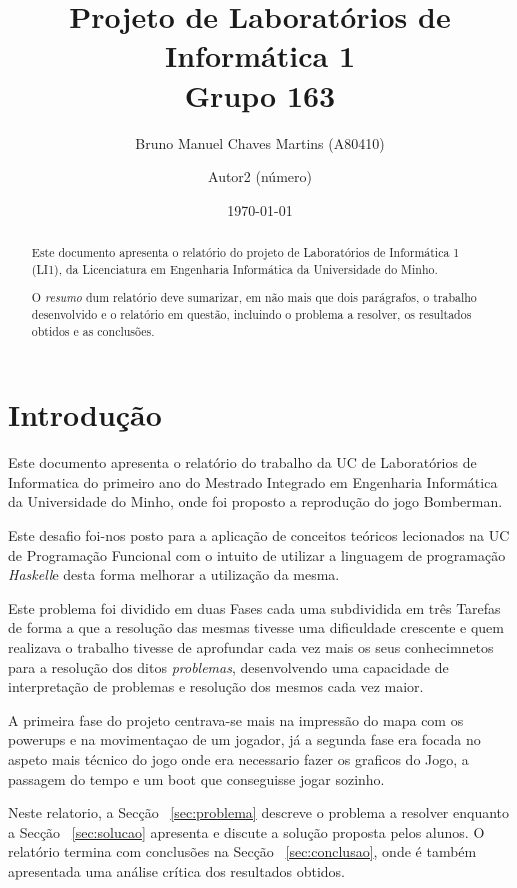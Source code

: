 \documentclass[a4paper]{article}
\title{Projeto de Laboratórios de Informática 1\\Grupo 163}
\author{Bruno Manuel Chaves Martins (A80410) \and Autor2 (número)}
\date{\today}
\begin{document}
\maketitle

\begin{abstract}
  Este documento apresenta o relatório do projeto de Laboratórios de Informática
  1 (LI1), da Licenciatura em Engenharia Informática da Universidade
  do Minho.

  O \emph{resumo} dum relatório deve sumarizar, em não mais que dois
  parágrafos, o trabalho desenvolvido e o relatório em questão,
  incluindo o problema a resolver, os resultados obtidos e as
  conclusões.
\end{abstract}

\tableofcontents

\section{Introdução}
\label{sec:intro}

Este documento apresenta o relatório do trabalho da UC de 
Laboratórios de Informatica do primeiro ano do Mestrado Integrado 
em Engenharia Informática da Universidade do Minho, onde foi proposto 
a reprodução do jogo Bomberman.

Este desafio foi-nos posto para a aplicação de conceitos teóricos 
lecionados na UC de Programação Funcional com o intuito de utilizar a
linguagem de programação \emph{Haskell}e desta forma melhorar a utilização 
da mesma.

Este problema foi dividido em duas Fases cada uma subdividida em três Tarefas
de forma a que a resolução das mesmas tivesse uma dificuldade crescente e quem realizava 
o trabalho tivesse de aprofundar cada vez mais os seus conhecimnetos para a resolução dos 
ditos \emph{problemas}, desenvolvendo uma capacidade de interpretação de problemas e resolução dos mesmos 
cada vez maior. 

A primeira fase do projeto centrava-se mais na impressão do mapa com os powerups
e na movimentaçao de um jogador, já a segunda fase era focada no aspeto mais técnico
do jogo onde era necessario fazer os graficos do Jogo, a passagem do tempo e um
boot que conseguisse jogar sozinho.

Neste relatorio, a
Secção ~\ref{sec:problema} descreve o problema a resolver enquanto a
Secção ~\ref{sec:solucao} apresenta e discute a solução proposta pelos
alunos. O relatório termina com conclusões na
Secção ~\ref{sec:conclusao}, onde é também apresentada uma análise
crítica dos resultados obtidos.
\end{document}
